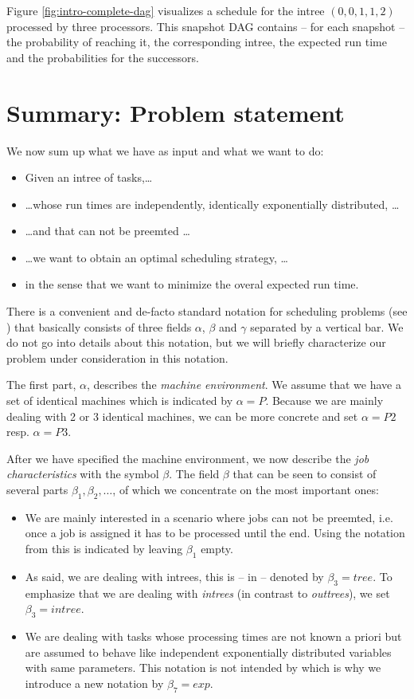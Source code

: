 Figure \ref{fig:intro-complete-dag} visualizes a schedule for the intree $(0,0,1,1,2)$ processed by three processors. This snapshot DAG contains -- for each snapshot -- the probability of reaching it, the corresponding intree, the expected run time and the probabilities for the successors.

\section{Summary: Problem statement}
\label{sec:introduction-aim}

We now sum up what we have as input and what we want to do:
\begin{itemize}
\item Given an intree of tasks,\dots
\item \dots whose run times are independently, identically exponentially distributed, \dots
\item \dots and that can not be preemted \dots
\item \dots we want to obtain an optimal scheduling strategy, \dots
\item in the sense that we want to minimize the overal expected run time.
\end{itemize}

There is a convenient and de-facto standard notation for scheduling problems (see \cite{schedulingclassification}) that basically consists of three fields $\alpha$, $\beta$ and $\gamma$ separated by a vertical bar. We do not go into details about this notation, but we will briefly characterize our problem under consideration in this notation.

The first part, $\alpha$, describes the \emph{machine environment}. We assume that we have a set of identical machines which is indicated by $\alpha = P$. Because we are mainly dealing with 2 or 3 identical machines, we can be more concrete and set $\alpha = P2$ resp. $\alpha=P3$.

After we have specified the machine environment, we now describe the \emph{job characteristics} with the symbol $\beta$. The field $\beta$ that can be seen to consist of several parts $\beta_1,\beta_2,\dots$, of which we concentrate on the most important ones:

\begin{itemize}
\item We are mainly interested in a scenario where jobs can not be preemted, i.e. once a job is assigned it has to be processed until the end. Using the notation from \cite{schedulingclassification} this is indicated by leaving $\beta_1$ empty.
\item As said, we are dealing with intrees, this is -- in \cite{schedulingclassification} -- denoted by $\beta_3=tree$. To emphasize that we are dealing with \emph{intrees} (in contrast to \emph{outtrees}), we set $\beta_3=intree$.
\item We are dealing with tasks whose processing times are not known a priori but are assumed to behave like  independent exponentially distributed variables with same parameters. This notation is not intended by \cite{schedulingclassification} which is why we introduce a new notation by $\beta_7 = exp$.
\end{itemize}

